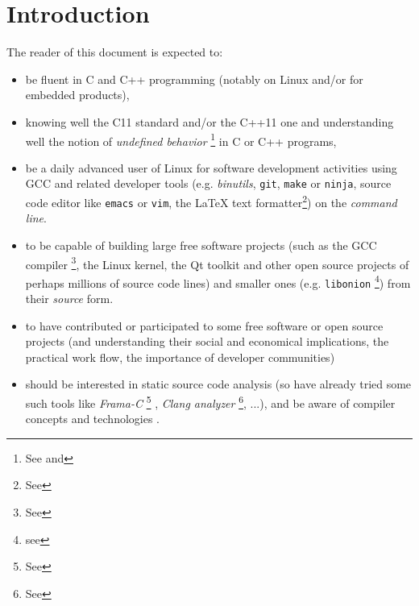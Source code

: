 \section{Introduction}

The reader of this document is expected to:
\begin{itemize}

  \item be fluent in C \cite{Kernighan:1988:CPL} and C++
    \cite{Stroustrup:2014:CplusPlus} programming (notably on Linux
    and/or for embedded products),

  \item knowing well the C11 standard
    \cite{C11:std,Memarian:2016:PLDI} and/or the C++11 one
    \cite{CplusPlus11:std} and understanding well the notion of
    \emph{undefined behavior} \footnote{See
      and } in C or C++
    programs,

  \item be a daily advanced user of Linux for software development
    activities using GCC and related developer tools
    (e.g. \textit{binutils}, \texttt{git}, \texttt{make} or
    \texttt{ninja}, source code editor like \texttt{emacs} or
    \texttt{vim}, the {\LaTeX} text formatter\footnote{See
      }) on the \emph{command
      line}.


\item to be capable of building large free software projects (such as
  the GCC compiler \cite{gcc-internals} \footnote{See
    }, the Linux kernel, the Qt toolkit and
  other open source projects of perhaps millions of source code lines)
  and smaller ones (e.g. \texttt{libonion} \footnote{see
    }) from their \emph{source}
  form.

\item to have contributed or participated to some free software or
  open source projects (and understanding their social and economical
  \cite{Weber:2004:SuccessOpenSource} implications, the practical work
  flow, the importance of developer communities)
  
\item should be interested in static source code analysis (so have
  already tried some such tools like \emph{Frama-C} \footnote{See
    } \cite{Cuoq:2012:Frama-C}, \emph{Clang
    analyzer} \footnote{See },
  ...), and be aware of compiler concepts and technologies \cite{Aho:2006:DragonBook}.


\end{itemize}
